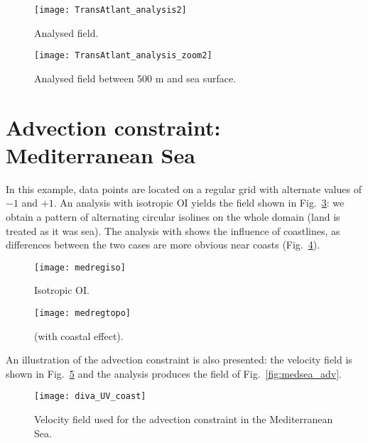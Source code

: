 \begin{figure}[H]
\centering
\texttt{[image: TransAtlant\_analysis2]}
\caption{Analysed field.\label{fig:transectanalysis}}
\end{figure}


\begin{figure}[H]
\centering
\texttt{[image: TransAtlant\_analysis\_zoom2]}
\caption{Analysed field between 500 m and sea surface.\label{fig:transanalysiszoom}}
\end{figure}




\section[Advection constraint]{Advection constraint: Mediterranean Sea}


In this example, data points are located on a regular grid with alternate values of $-1$ and $+1$. An analysis with isotropic OI  yields the field shown in Fig.~\ref{fig:medregiso}: we obtain a pattern of alternating circular isolines on the whole domain (land is treated as it was sea). The analysis with \diva shows the influence of coastlines, as differences between the two cases are more obvious near coasts (Fig.~\ref{fig:medregtopo}).  

\begin{figure}[H]
\centering
\parbox{.6\textwidth}{
\texttt{[image: medregiso]}
}\parbox{.4\textwidth}{
\caption{Isotropic OI.\label{fig:medregiso}}
}
\end{figure}


\begin{figure}[H]
\centering
\parbox{.6\textwidth}{
\texttt{[image: medregtopo]}
}\parbox{.4\textwidth}{
\caption{\diva (with coastal effect).\label{fig:medregtopo} }
}
\end{figure}

An illustration of the advection constraint  is also presented: the velocity field is shown in Fig.~\ref{fig:medsea_vel} and the analysis produces the field of Fig.~\ref{fig:medsea_adv}.

\begin{figure}[H]
\centering
\parbox{.6\textwidth}{
\texttt{[image: diva\_UV\_coast]}
}\parbox{.4\textwidth}{
\caption{Velocity field used for the advection constraint in the Mediterranean Sea.\label{fig:medsea_vel}}
}
\end{figure}


